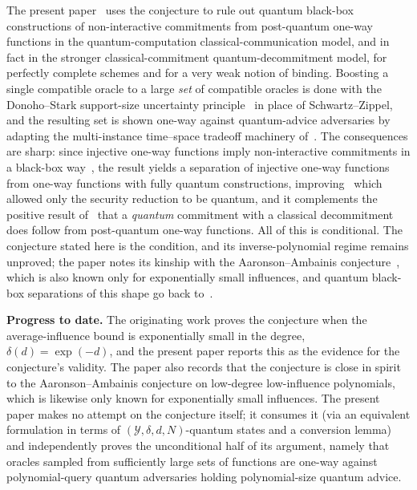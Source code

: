 \documentclass{conjura-conjecture}
\newcommand{\cY}{\mathcal{Y}}
\begin{document}
The present paper~\cite{CLM23} uses the conjecture to rule out quantum
black-box constructions of non-interactive commitments from post-quantum
one-way functions in the quantum-computation classical-communication
model, and in fact in the stronger classical-commitment
quantum-decommitment model, for perfectly complete schemes and for a very
weak notion of binding. Boosting a single compatible oracle to a large
\emph{set} of compatible oracles is done with the Donoho--Stark
support-size uncertainty principle~\cite{DS89} in place of
Schwartz--Zippel, and the resulting set is shown one-way against
quantum-advice adversaries by adapting the multi-instance time--space
tradeoff machinery of~\cite{CGLQ20}. The consequences are sharp: since
injective one-way functions imply non-interactive commitments in a
black-box way~\cite{GL89}, the result yields a separation of injective
one-way functions from one-way functions with fully quantum
constructions, improving~\cite{CX21} which allowed only the security
reduction to be quantum, and it complements the positive result
of~\cite{BB21} that a \emph{quantum} commitment with a classical
decommitment does follow from post-quantum one-way functions. All of this
is conditional. The conjecture stated here is the condition, and its
inverse-polynomial regime remains unproved; the paper notes its kinship
with the Aaronson--Ambainis conjecture~\cite{AA09}, which is also known
only for exponentially small influences, and quantum black-box
separations of this shape go back to~\cite{HY20}.

\textbf{Progress to date.} The originating work proves the conjecture
when the average-influence bound is exponentially small in the degree,
$\delta(d) = \exp(-d)$, and the present paper reports this as the
evidence for the conjecture's validity. The paper also records that the
conjecture is close in spirit to the Aaronson--Ambainis conjecture on
low-degree low-influence polynomials, which is likewise only known for
exponentially small influences. The present paper makes no attempt on the
conjecture itself; it consumes it (via an equivalent formulation in terms
of $(\cY,\delta,d,N)$-quantum states and a conversion lemma) and
independently proves the unconditional half of its argument, namely that
oracles sampled from sufficiently large sets of functions are one-way
against polynomial-query quantum adversaries holding polynomial-size
quantum advice.
\end{document}
